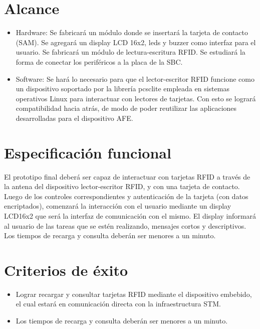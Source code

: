 \section{Alcance}

\begin{itemize}

\item Hardware: Se fabricar\'a un m\'odulo donde se insertar\'a la tarjeta de contacto (SAM).
      Se agregar\'a un display LCD 16x2, leds y buzzer como interfaz para el usuario. Se fabricar\'a un m\'odulo de lectura-escritura RFID. Se estudiar\'a la forma de conectar los perif\'ericos a la placa de la SBC.

\item Software: Se har\'a lo necesario para que el lector-escritor RFID funcione como un dispositivo soportado por la librer\'ia pcsclite empleada en sistemas operativos Linux para interactuar con lectores de tarjetas. Con esto se lograr\'a compatibilidad hacia atr\'as, de modo de poder reutilizar las aplicaciones desarrolladas para el dispositivo AFE.
    
\end{itemize}

\section{Especificaci\'on funcional}

El prototipo final deber\'a ser capaz de interactuar con tarjetas RFID a trav\'es de la antena del dispositivo lector-escritor RFID, y con una tarjeta de contacto. Luego de los controles correspondientes y autenticaci\'on de la tarjeta (con datos encriptados), comenzar\'a la interacci\'on con el usuario mediante un display LCD16x2 que ser\'a la interfaz de comunicaci\'on con el mismo. El display informar\'a al usuario de las tareas que se est\'en realizando, mensajes cortos y descriptivos. Los tiempos de recarga y consulta deber\'an ser menores a un minuto.

\section{Criterios de \'exito}

\begin{itemize}

\item Lograr recargar y consultar tarjetas RFID mediante el dispositivo embebido, el cual estar\'a en comunicaci\'on directa con la infraestructura STM.

\item Los tiempos de recarga y consulta deber\'an ser menores a un minuto.

\end{itemize}